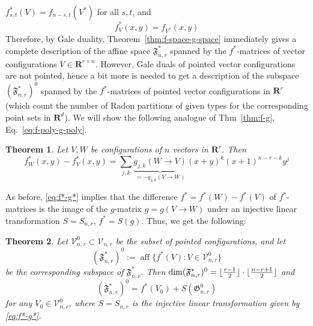 \documentclass[11pt]{article}
\newtheorem{theorem}{Theorem}
\DeclareMathOperator{\aff}{aff}
\newcommand{\fspace}{\mathfrak{F}}
\newcommand{\gspace}{\mathfrak{G}}
\newcommand{\R}{\mathbf{R}}
\DeclarePairedDelimiter\floor{\lfloor}{\rfloor}
\begin{document}
$f^*_{s,t}(V)=f_{n-s,t}(V^*)$ for all $s,t$, and 
\[
f^*_V(x,y)=f_{V^*}(x,y)
\]
Therefore, by Gale duality, Theorem~\ref{thm:f-space-g-space} immediately gives a complete description of the affine space 
$\fspace^*_{n,r}$ spanned by the $f^*$-matrices of vector configurations $V\in \R^{r\times n}$. However, Gale duals of pointed vector configurations are not pointed, hence a bit more is needed to get a description of the subspace 
$(\fspace^*_{n,r})^0$ spanned by the $f^*$-matrices of pointed vector configurations in $\R^r$ (which count the number of Radon partitions of given types for the corresponding point sets in $\R^d$). We will show the following analogue of Thm~\ref{thm:f-g}, Eq.~\eqref{eq:f-poly-g-poly}.
%
\begin{theorem}
\label{thm:f*-g*}
Let $V,W$ be configurations of $n$ vectors in $\R^r$. Then
\begin{equation}
\label{eq:f*-g*}
f^*_W(x,y) - f^*_{V}(x,y)= \sum_{j,k} \underbrace{g_{j,k}(W \to V)}_{=-g_{j,k}(V \to W)} (x+y)^k (x+1)^{n-r-k} y^j
\end{equation}
\end{theorem}
As before, \eqref{eq:f*-g*} implies that the difference $f^*=f^*(W)-f^*(V)$ of $f^*$-matrices is the image of the $g$-matrix $g=g(V\to W)$ under an injective linear transformation $S=S_{n,r}$, $f^*=S(g)$. Thus, we get the following:
%
\begin{theorem}
\label{thm:fstar-space-gstar-space-pointed}
Let $\mathcal{V}^0_{n,r} \subset \mathcal{V}_{n,r}$ be the subset of pointed configurations, and let  
\[
(\fspace^*_{n,r})^0:=\aff\{f^*(V)\colon V\in \mathcal{V}^0_{n,r}\}
\]
be the corresponding subspace of $\fspace^*_{n,r}$. Then $\dim (\fspace^*_{n,r})^0=\floor{\frac{r-1}{2}}\cdot \floor{\frac{n-r+1}{2}}$ and
\[ 
(\fspace^*_{n,r})^0=f^*(V_0)+S(\gspace^0_{n,r})
\]
for any $V_0 \in \mathcal{V}^0_{n,r}$, where $S=S_{n,r}$ is the injective linear transformation given by \eqref{eq:f*-g*}.
\end{theorem}
\end{document}
